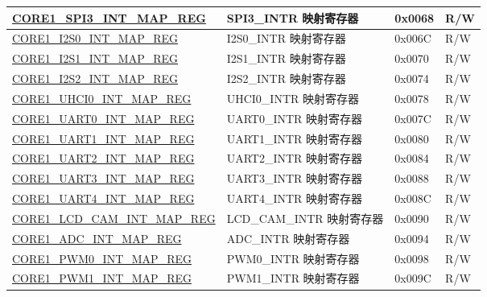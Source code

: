 \begin{longtable}{ | p{8.7cm} | p{6.2cm} | p{1.3cm} | p{1cm} | }
\hyperref[regdesc:CORE1SPI3INTMAPREG]{CORE1\_SPI3\_INT\_MAP\_REG} & SPI3\_INTR 映射寄存器 & 0x0068 & R/W \\ \hline

\hyperref[regdesc:CORE1I2S0INTMAPREG]{CORE1\_I2S0\_INT\_MAP\_REG} & I2S0\_INTR 映射寄存器 & 0x006C & R/W \\ \hline

\hyperref[regdesc:CORE1I2S1INTMAPREG]{CORE1\_I2S1\_INT\_MAP\_REG} & I2S1\_INTR 映射寄存器 & 0x0070 & R/W \\ \hline

\hyperref[regdesc:CORE1I2S2INTMAPREG]{CORE1\_I2S2\_INT\_MAP\_REG} & I2S2\_INTR 映射寄存器 & 0x0074 & R/W \\ \hline

\hyperref[regdesc:CORE1UHCI0INTMAPREG]{CORE1\_UHCI0\_INT\_MAP\_REG} & UHCI0\_INTR 映射寄存器 & 0x0078 & R/W \\ \hline

\hyperref[regdesc:CORE1UART0INTMAPREG]{CORE1\_UART0\_INT\_MAP\_REG} & UART0\_INTR 映射寄存器 & 0x007C & R/W \\ \hline

\hyperref[regdesc:CORE1UART1INTMAPREG]{CORE1\_UART1\_INT\_MAP\_REG} & UART1\_INTR 映射寄存器 & 0x0080 & R/W \\ \hline

\hyperref[regdesc:CORE1UART2INTMAPREG]{CORE1\_UART2\_INT\_MAP\_REG} & UART2\_INTR 映射寄存器 & 0x0084 & R/W \\ \hline

\hyperref[regdesc:CORE1UART3INTMAPREG]{CORE1\_UART3\_INT\_MAP\_REG} & UART3\_INTR 映射寄存器 & 0x0088 & R/W \\ \hline

\hyperref[regdesc:CORE1UART4INTMAPREG]{CORE1\_UART4\_INT\_MAP\_REG} & UART4\_INTR 映射寄存器 & 0x008C & R/W \\ \hline

\hyperref[regdesc:CORE1LCDCAMINTMAPREG]{CORE1\_LCD\_CAM\_INT\_MAP\_REG} & LCD\_CAM\_INTR 映射寄存器 & 0x0090 & R/W \\ \hline

\hyperref[regdesc:CORE1ADCINTMAPREG]{CORE1\_ADC\_INT\_MAP\_REG} & ADC\_INTR 映射寄存器 & 0x0094 & R/W \\ \hline

\hyperref[regdesc:CORE1PWM0INTMAPREG]{CORE1\_PWM0\_INT\_MAP\_REG} & PWM0\_INTR 映射寄存器 & 0x0098 & R/W \\ \hline

\hyperref[regdesc:CORE1PWM1INTMAPREG]{CORE1\_PWM1\_INT\_MAP\_REG} & PWM1\_INTR 映射寄存器 & 0x009C & R/W \\ \hline


\end{longtable}
